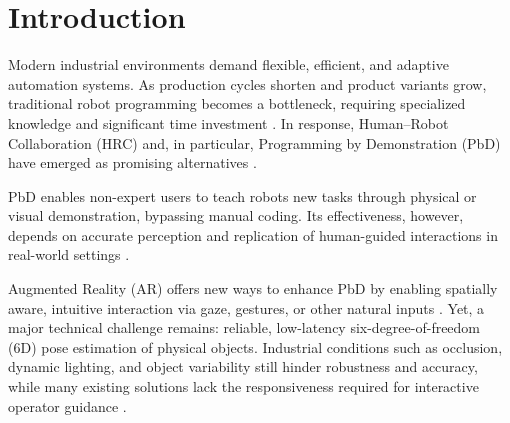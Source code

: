 \section{Introduction}








Modern industrial environments demand flexible, efficient, and adaptive automation systems. As production cycles shorten and product variants grow, traditional robot programming becomes a bottleneck, requiring specialized knowledge and significant time investment \cite{calinon2009robot}. In response, Human--Robot Collaboration (HRC) and, in particular, Programming by Demonstration (PbD) have emerged as promising alternatives \cite{calinon2009robot}.

PbD enables non-expert users to teach robots new tasks through physical or visual demonstration, bypassing manual coding. Its effectiveness, however, depends on accurate perception and replication of human-guided interactions in real-world settings \cite{calinon2009robot}.

Augmented Reality (AR) offers new ways to enhance PbD by enabling spatially aware, intuitive interaction via gaze, gestures, or other natural inputs \cite{lotsaris2021ar}. Yet, a major technical challenge remains: reliable, low-latency six-degree-of-freedom (6D) pose estimation of physical objects. Industrial conditions such as occlusion, dynamic lighting, and object variability still hinder robustness and accuracy, while many existing solutions lack the responsiveness required for interactive operator guidance \cite{thalhammer2024challenges}.

